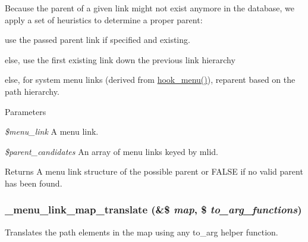 Because the parent of a given link might not exist anymore in the database, we apply a set of heuristics to determine a proper parent:


\begin{DoxyItemize}
\item use the passed parent link if specified and existing.
\item else, use the first existing link down the previous link hierarchy
\item else, for system menu links (derived from \hyperlink{group__hooks_ga5c95244fea59b25666e409759e133ded}{hook\_\-menu()}), reparent based on the path hierarchy.
\end{DoxyItemize}


\begin{DoxyParams}{Parameters}
\item[{\em \$menu\_\-link}]A menu link. \item[{\em \$parent\_\-candidates}]An array of menu links keyed by mlid.\end{DoxyParams}
\begin{DoxyReturn}{Returns}
A menu link structure of the possible parent or FALSE if no valid parent has been found. 
\end{DoxyReturn}
\hypertarget{group__menu_gaac930b7a3cacbf70430c8dc3aa884198}{
\subsubsection[{\_\-menu\_\-link\_\-map\_\-translate}]{\setlength{\rightskip}{0pt plus 5cm}\_\-menu\_\-link\_\-map\_\-translate (\&\$ {\em map}, \/  \$ {\em to\_\-arg\_\-functions})}}
\label{group__menu_gaac930b7a3cacbf70430c8dc3aa884198}
Translates the path elements in the map using any to\_\-arg helper function.


